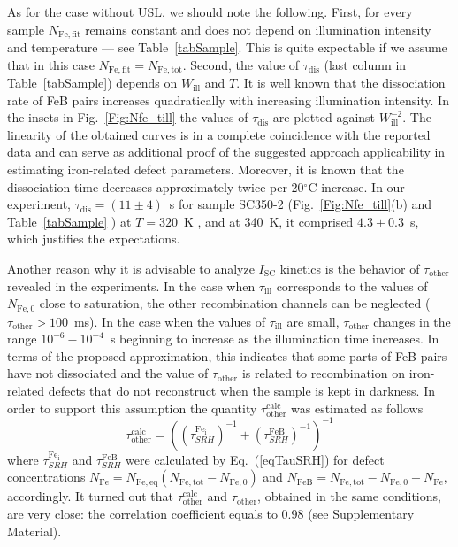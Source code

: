 \documentclass[%
 aip,jap,
 amsmath,amssymb,
 reprint,%
]{revtex4-1}
\begin{document}
As for the case without USL, we should note the following.
First, for every sample $N_\mathrm{Fe,fit}$ remains constant and does not depend on illumination intensity and temperature --- see Table~\ref{tabSample}.
This is quite expectable if we assume that
in this case $N_\mathrm{Fe,fit}=N_\mathrm{Fe,tot}$.
Second, the value of $\tau_\mathrm{dis}$
(last column in Table~\ref{tabSample})
depends on $W_\mathrm{ill}$ and $T$.
It is well known \cite{Schmidt2019,FeBLight2,FeBKin2019} that the dissociation rate of FeB pairs increases quadratically with increasing illumination intensity.
In the insets in Fig.~\ref{Fig:Nfe_till} the values of $\tau_\mathrm{dis}$
are plotted against $W_\mathrm{ill}^{-2}$.
The linearity of the obtained curves is in a complete coincidence
with the reported data and can serve as additional proof of the suggested approach
applicability in estimating iron-related defect parameters.
Moreover, it is known \cite{Lagowskii1993} that the dissociation time decreases approximately twice per 20$^\circ$C increase.
In our experiment, $\tau_\mathrm{dis}=(11\pm4)$~s for sample SC350-2
(Fig.~\ref{Fig:Nfe_till}(b) and
Table~\ref{tabSample}
) at $T=320$~K , and at 340~K,
it comprised $4.3\pm0.3$~s, which justifies the expectations.

Another reason why it is advisable to analyze $I_\mathrm{SC}$ kinetics is the behavior of
$\tau_\mathrm{other}$ revealed in the experiments.
In the case when $\tau_\mathrm{ill}$ corresponds to the values of $N_\mathrm{Fe,0}$ close to saturation, the other recombination channels  can be neglected ($\tau_\mathrm{other}> 100$~ms).
In the case when the values of $\tau_\mathrm{ill}$ are small,
$\tau_\mathrm{other}$ changes in the range $10^{-6}-10^{-4}$~s beginning to increase as the illumination time increases.
In terms of the proposed approximation, this indicates that some parts of FeB pairs have not dissociated and the value of $\tau_\mathrm{other}$ is related
to recombination on iron-related defects that do not reconstruct when the sample is kept in darkness. In order to support this assumption the quantity
$\tau_\mathrm{other}^\mathrm{calc}$
was estimated as follows
\begin{equation*}
\tau_\mathrm{other}^\mathrm{calc}=\left(\left(\tau_{SRH}^\mathrm{Fe_i}\right)^{-1}
+\left(\tau_{SRH}^\mathrm{FeB}\right)^{-1}\right)^{-1}
\end{equation*}
where
$\tau_{SRH}^\mathrm{Fe_i}$ and $\tau_{SRH}^\mathrm{FeB}$
were calculated by Eq.~(\ref{eqTauSRH}) for defect concentrations
$N_\mathrm{Fe}=N_\mathrm{Fe,eq}(N_\mathrm{Fe,tot}-N_\mathrm{Fe,0})$
and $N_\mathrm{FeB}= N_\mathrm{Fe,tot}-N_\mathrm{Fe,0}- N_\mathrm{Fe}$, accordingly.
It turned out that $\tau_\mathrm{other}^\mathrm{calc}$ and
$\tau_\mathrm{other}$, obtained in the same conditions, are very close:
the correlation coefficient equals to 0.98 (see Supplementary Material).
\end{document}
